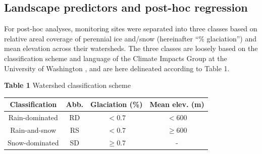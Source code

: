\documentclass[notitlepage]{article}
\begin{document}
\subsection*{Landscape predictors and post-hoc regression}
For post-hoc analyses, monitoring sites were separated into three classes based on relative areal coverage of perennial ice and/snow (hereinafter ``\% glaciation'') and mean elevation across their watersheds. The three classes are loosely based on the classification scheme and language of the Climate Impacts Group at the University of Washington \citep{mauger2015CIG}, and are here delineated according to Table 1.

\begin{center}
\textbf{Table 1} Watershed classification scheme
\end{center}
\begin{center}
\begin{tabular}{ |c|c|c|c| }
 \hline
 Classification & Abb. & Glaciation (\%) & Mean elev. (m) \\
 \hline
 Rain-dominated & RD & $< 0.7$ & $< 600$ \\
 Rain-and-snow & RS & $< 0.7$ & $\geq 600$ \\
 Snow-dominated & SD & $\geq 0.7$ & - \\
 \hline
\end{tabular}
\end{center}
\end{document}
